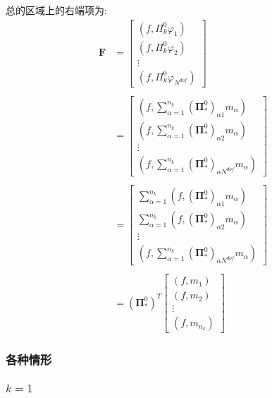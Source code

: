 总的区域上的右端项为: \\
\begin{equation*}
\begin{aligned}
\mathbf F & = \begin{bmatrix}
(f, \Pi^0_k\varphi_1) \\
(f, \Pi^0_k\varphi_2) \\
\vdots\\
(f, \Pi^0_k\varphi_{N^{dof}})
\end{bmatrix} \\
\\
& = \begin{bmatrix}
(f,\sum_{\alpha = 1}^{n_k}(\boldsymbol \Pi_{*}^0)_{\alpha 1}m_\alpha) \\
(f,\sum_{\alpha = 1}^{n_k}(\boldsymbol \Pi_{*}^0)_{\alpha 2}m_\alpha) \\
\vdots \\
(f,\sum_{\alpha = 1}^{n_k}(\boldsymbol \Pi_{*}^0)_{\alpha N^{dof}}m_\alpha)
\end{bmatrix} \\
\\
& = \begin{bmatrix}
\sum_{\alpha = 1}^{n_k}(f,(\boldsymbol \Pi_{*}^0)_{\alpha 1}m_\alpha) \\
\sum_{\alpha = 1}^{n_k}(f,(\boldsymbol \Pi_{*}^0)_{\alpha 2}m_\alpha) \\
\vdots \\
(f,\sum_{\alpha = 1}^{n_k}(\boldsymbol \Pi_{*}^0)_{\alpha N^{dof}}m_\alpha)
\end{bmatrix} \\
\\
& =(\boldsymbol \Pi_{*}^0)^T\begin{bmatrix}
(f, m_1)\\ (f, m_2) \\ \vdots \\ (f, m_{n_k})
\end{bmatrix}
\end{aligned}
\end{equation*}

\subsubsection{各种情形}
\subsubsection{$k= 1$}

